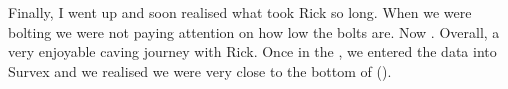 Finally, I went up and soon realised what took Rick so long. When we were bolting
we were not paying attention on how low the bolts are. Now . Overall, a very
enjoyable caving journey with Rick. Once in the , we entered the
data into Survex and we realised we were very close to the bottom of
 ().




